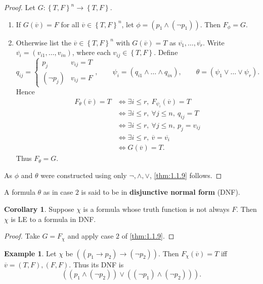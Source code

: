 \documentclass{article}
\newcommand{\rb}[1]{\left( #1 \right)}
\newcommand{\cb}[1]{\left\{ #1 \right\}}
\newcommand{\notb}[1]{\rb{\neg #1}}
\newcommand{\orb}[2]{\rb{#1 \lor #2}}
\newcommand{\andb}[2]{\rb{#1 \land #2}}
\newcommand{\impb}[2]{\rb{#1 \rightarrow #2}}
\theoremstyle{definition}\newtheorem{definition}{Definition}[subsection]
\theoremstyle{definition}\newtheorem{remark}[definition]{Remark}
\theoremstyle{definition}\newtheorem*{example}{Example}
\theoremstyle{definition}\newtheorem*{note}{Note}
\newtheorem{corollary}[definition]{Corollary}
\begin{document}
\begin{proof}
Let $ G : \cb{T, F}^n \to \cb{T, F} $.
\begin{enumerate}
\item If $ G\rb{\overline{v}} = F $ for all $ \overline{v} \in \cb{T, F}^n $, let $ \phi = \andb{p_1}{\notb{p_1}} $. Then $ F_\phi = G $.
\item Otherwise list the $ \overline{v} \in \cb{T, F}^n $ with $ G\rb{\overline{v}} = T $ as $ \overline{v_1}, \dots, \overline{v_r} $. Write $ \overline{v_i} = \rb{v_{i1}, \dots, v_{in}} $, where each $ v_{ij} \in \cb{T, F} $. Define
$$ q_{ij} = \begin{cases} p_j & v_{ij} = T \\ \notb{p_j} & v_{ij} = F \end{cases}, \qquad \psi_i = \rb{q_{i1} \land \dots \land q_{in}}, \qquad \theta = \rb{\psi_1 \lor \dots \lor \psi_r}. $$
Hence
\begin{align*}
F_\theta\rb{\overline{v}} = T
& \iff \exists i \le r, \ F_{\psi_i}\rb{\overline{v}} = T \\
& \iff \exists i \le r, \ \forall j \le n, \ q_{ij} = T \\
& \iff \exists i \le r, \ \forall j \le n, \ p_j = v_{ij} \\
& \iff \exists i \le r, \ \overline{v} = \overline{v_i} \\
& \iff G\rb{\overline{v}} = T.
\end{align*}
Thus $ F_\theta = G $.
\end{enumerate}
As $ \phi $ and $ \theta $ were constructed using only $ \neg, \land, \lor $, \ref{thm:1.1.9} follows.
\end{proof}

A formula $ \theta $ as in case $ 2 $ is said to be in \textbf{disjunctive normal form} (DNF).

\begin{corollary}
Suppose $ \chi $ is a formula whose truth function is not always $ F $. Then $ \chi $ is LE to a formula in DNF.
\end{corollary}

\begin{proof}
Take $ G = F_\chi $ and apply case $ 2 $ of \ref{thm:1.1.9}.
\end{proof}

\begin{example}
Let $ \chi $ be $ \impb{\impb{p_1}{p_2}}{\notb{p_2}} $. Then $ F_\chi\rb{\overline{v}} = T $ iff $ \overline{v} = \rb{T, F}, \rb{F, F} $. Thus its DNF is
$$ \orb{\andb{p_1}{\notb{p_2}}}{\andb{\notb{p_1}}{\notb{p_2}}}. $$
\end{example}
\end{document}
